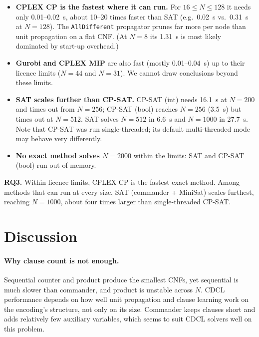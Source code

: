 \documentclass[a4paper,fleqn]{cas-sc}
\begin{document}
\begin{itemize}
  \item \textbf{CPLEX CP is the fastest where it can run.} For $16\le N\le128$ it needs only 0.01--0.02~s, about 10--20 times faster than SAT (e.g.\ 0.02~s vs.\ 0.31~s at $N=128$). The \texttt{AllDifferent} propagator prunes far more per node than unit propagation on a flat CNF. (At $N=8$ its 1.31~s is most likely dominated by start-up overhead.)
  \item \textbf{Gurobi and CPLEX MIP} are also fast (mostly 0.01--0.04~s) up to their licence limits ($N=44$ and $N=31$). We cannot draw conclusions beyond these limits.
  \item \textbf{SAT scales further than CP-SAT.} CP-SAT (int) needs 16.1~s at $N=200$ and times out from $N=256$; CP-SAT (bool) reaches $N=256$ (3.5~s) but times out at $N=512$. SAT solves $N=512$ in 6.6~s and $N=1000$ in 27.7~s. Note that CP-SAT was run single-threaded; its default multi-threaded mode may behave very differently.
  \item \textbf{No exact method solves $N=2000$} within the limits: SAT and CP-SAT (bool) run out of memory.
\end{itemize}

\begin{finding}
\textbf{RQ3.} Within licence limits, CPLEX CP is the fastest exact method. Among methods that can run at every size, SAT (commander + MiniSat) scales furthest, reaching $N=1000$, about four times larger than single-threaded CP-SAT.
\end{finding}

\section{Discussion}\label{sec:discussion}

\paragraph{Why clause count is not enough.}
Sequential counter and product produce the smallest CNFs, yet sequential is much slower than commander, and product is unstable across $N$. CDCL performance depends on how well unit propagation and clause learning work on the encoding's structure, not only on its size. Commander keeps clauses short and adds relatively few auxiliary variables, which seems to suit CDCL solvers well on this problem.
\end{document}
